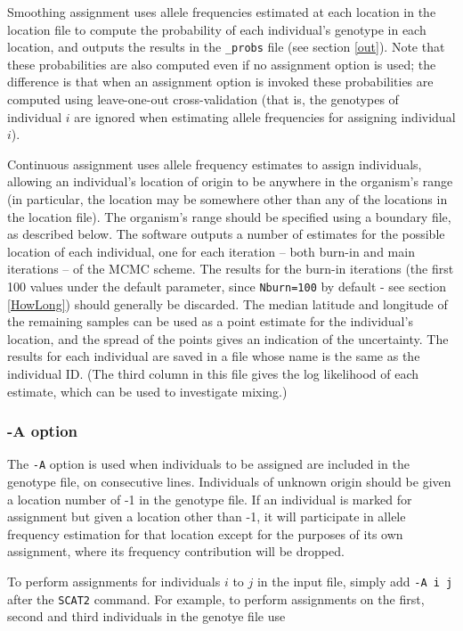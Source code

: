 \documentclass[10pt,titlepage,times,letterpaper]{article}
\def\SCAT{{\tt SCAT2} }
\begin{document}
Smoothing assignment uses allele frequencies estimated at each
location in the location file to compute the probability of each
individual's genotype in each location, and outputs the results in the
{\tt \_probs} file (see section \ref{out}). Note that these
probabilities are also computed even if no assignment option is
used; the difference is that when an assignment option is invoked these
probabilities are computed using leave-one-out cross-validation 
(that is, the genotypes of individual $i$ are ignored when estimating allele
frequencies for assigning individual $i$).

Continuous assignment uses allele frequency estimates to assign
individuals, allowing an individual's location of origin to be
anywhere in the organism's range (in particular, the location may
be somewhere other than any of the locations in the location
file). The organism's range should be specified using a
boundary file, as described below. The software outputs a number of
estimates for the possible location of each individual, one for each
iteration -- both burn-in and main iterations -- of the MCMC
scheme. The results for the burn-in iterations (the first 100 values
under the default parameter, since {\tt Nburn=100} by default - see section
\ref{HowLong}) should generally be discarded. The median latitude and
longitude of the remaining samples can be used as a point estimate for
the individual's location, and the spread of the points gives an
indication of the uncertainty. The results for each individual are saved 
in a file whose name is the same as the individual ID. (The third column in
this file gives the log likelihood of each estimate, which can be
used to investigate mixing.)

\subsubsection{-A option}

The {\tt -A} option is used when
individuals to be assigned are included in the genotype file, on
consecutive lines. Individuals of unknown origin should be given a
location number of -1 in the genotype file.  If an individual is marked for
assignment but given a location other than -1, it will participate in
allele frequency estimation for that location except for the purposes
of its own assignment, where its frequency contribution will be dropped.

To perform assignments for individuals $i$ to $j$ in the input file,
simply add {\tt -A i j} after the \SCAT command. For example, to
perform assignments on the first, second and third individuals in the
genotye file use
\end{document}
